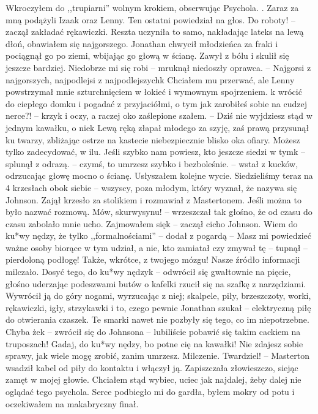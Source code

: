 \documentclass[../MAIN.tex]{subfiles}
\begin{document}
\qd
Wkroczyłem do ,,trupiarni'' wolnym krokiem, obserwując Psychola. . Zaraz za mną podążyli Izaak oraz Lenny. Ten ostatni powiedział na głos.
\sx Do roboty! -- zaczął zakładać rękawiczki. \qd
Reszta uczyniła to samo, nakładając lateks na lewą dłoń, obawiałem się najgorszego.
Jonathan chwycił młodzieńca za fraki i pociągnął go po ziemi, wbijając go głową w ścianę. Zawył z bólu i skulił się jeszcze bardziej.
%
\sx Niedobrze mi się robi -- mruknął niedoszły oprawca. -- Najgorsi z najgorszych, najpodlejsi z najpodlejszych\3k\qd
Chciałem mu przerwać, ale Lenny powstrzymał mnie szturchnięciem w łokieć i wymownym spojrzeniem.
\sx \3k wrócić do ciepłego domku i pogadać z przyjaciółmi, o tym jak zarobiłeś sobie na cudzej nerce?! -- krzyk i oczy, a raczej oko zaślepione szałem. -- Dziś nie wyjdziesz stąd w jednym kawałku, o nie\3k
\qd
Lewą ręką złapał młodego za szyję, zaś prawą przysunął ku twarzy, zbliżając ostrze na kastecie niebezpiecznie blisko oka ofiary.
%
\sx Możesz tylko zadecydować, w ilu. Jeśli szybko nam powiesz, kto jeszcze siedzi w tym\3k -- splunął z odrazą. -- czymś, to umrzesz szybko i bezboleśnie. -- wstał z kucków, odrzucając głowę mocno o ścianę. Usłyszałem kolejne wycie.
\qd
Siedzieliśmy teraz na 4 krzesłach obok siebie -- wszyscy, poza młodym, który wyznał, że nazywa się Johnson. Zajął krzesło za stolikiem i rozmawiał z Mastertonem. Jeśli można to było nazwać rozmową.
\sx Mów, skurwysynu! -- wrzeszczał tak głośno, że od czasu do czasu zabolało mnie ucho.
\xx Zajmowałem się\3k -- zaczął cicho Johnson.
\xx Wiem do ku*wy nędzy, że tylko ,,formalnościami'' -- dodał z pogardą -- Masz mi powiedzieć ważne osoby biorące w tym udział, a nie, kto zamiatał czy zmywał tę -- tupnął -- pierdoloną podłogę! Także, wkrótce, z twojego mózgu!
\qd
Nasze źródło informacji milczało.
\sx Dosyć tego, do ku*wy nędzy\3k -- odwrócił się gwałtownie na pięcie, głośno uderzając podeszwami butów o kafelki rzucił się na szafkę z narzędziami.
\qd
Wywrócił ją do góry nogami, wyrzucając z niej; skalpele, piły, brzeszczoty, worki, rękawiczki, igły, strzykawki i to, czego pewnie Jonathan szukał -- elektryczną piłę do otwierania czaszek.
\sx Te smarki nawet nie pozbyły się tego, co im niepotrzebne. Chyba że\3k -- zwrócił się do Johnsona -- lubiliście pobawić się takim cackiem na truposzach! Gadaj, do ku*wy nędzy, bo potne cię na kawałki! Nie zdajesz sobie sprawy, jak wiele mogę zrobić, zanim umrzesz.
\qd
Milczenie.
\sx Twardziel! -- Masterton wsadził kabel od piły do kontaktu i włączył ją.
\qd
Zapiszczała złowieszczo, siejąc zamęt w mojej głowie. Chciałem stąd wybiec, uciec jak najdalej, żeby dalej nie oglądać tego psychola. Serce podbiegło mi do gardła, byłem mokry od potu i oczekiwałem na makabryczny finał. \\
\end{document}
